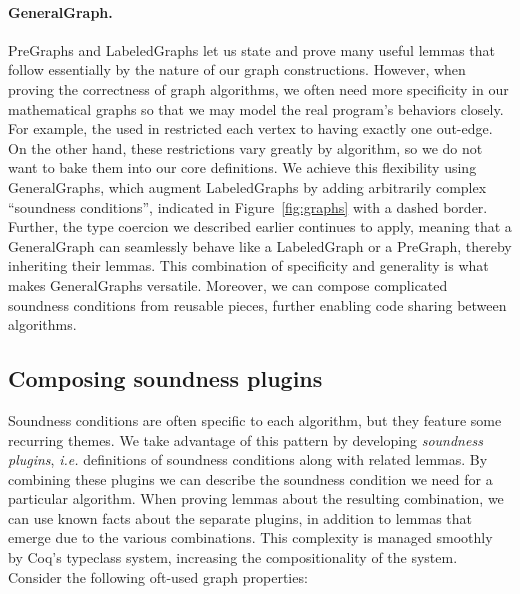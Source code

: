 
\vspace{-0.75ex}
\paragraph{GeneralGraph.}
PreGraphs and LabeledGraphs let us state
and prove many useful lemmas that follow essentially by the nature
of our graph constructions. However, when proving the correctness of graph
algorithms, we often need more specificity in our mathematical graphs
so that we may model the real program's behaviors closely.
For example, the  used in 
restricted each vertex to having exactly one out-edge.
On the other hand, these restrictions vary greatly by algorithm, so we do not
want to bake them into our core definitions.
We achieve this flexibility using GeneralGraphs, which augment
LabeledGraphs by adding arbitrarily complex ``soundness conditions'', indicated in
Figure~\ref{fig:graphs} with a dashed border.
Further, the type coercion we described earlier continues to apply,
meaning that a GeneralGraph can seamlessly behave like a
LabeledGraph or a PreGraph, thereby inheriting their lemmas.
This combination of specificity and generality is
what makes GeneralGraphs versatile. Moreover, we can
compose complicated soundness conditions from reusable pieces,
further enabling code sharing between algorithms.





\subsection{Composing soundness plugins}
\label{subsec:graphplugins}


Soundness conditions are often specific %
to each algorithm, but they feature some recurring themes.
We take advantage of this pattern by developing %
\emph{soundness plugins}, \emph{i.e.} definitions of soundness
conditions along with related lemmas.  By combining these plugins
we can describe the soundness condition we need for a particular
algorithm.  When proving lemmas about the resulting combination,
we can use known facts about the separate plugins, in addition to
lemmas that emerge due to the various combinations.  This complexity
is managed smoothly by Coq's typeclass system, increasing the
compositionality of the system.
Consider the following oft-used graph properties:


